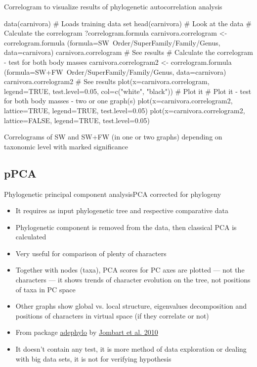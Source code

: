 \documentclass[compress, xelatex, 11pt, xcolor=svgnames, aspectratio=169,
	hyperref={
		bookmarks=true,
		unicode=true,
		colorlinks=true,
		pdftitle={Molecular data in R},
		plainpages=false,
		pdfauthor={Vojtech Zeisek},
		pdfsubject={Course about phylogeny and evolution in R},
		pdfcreator={XeLaTeX},
		pdfkeywords={R, evolution, phylogeny, molecular data},
		linkcolor=Crimson, %
		anchorcolor=Magenta, %
		citecolor=Magenta, %
		filecolor=Magenta, %
		menucolor=Magenta, %
		urlcolor=DodgerBlue, %
		},
	url={hyphens, lowtilde} %
	]{beamer}
\renewcommand{\texttt}[1]{\colorbox{Beige}{{\ttfamily #1}}}
\begin{document}
\begin{frame}[fragile]{Correlogram to visualize results of phylogenetic autocorrelation analysis}
	\begin{spluscode}
    data(carnivora) # Loads training data set
    head(carnivora) # Look at the data
    # Calculate the correlogram
    ?correlogram.formula
    carnivora.correlogram <- correlogram.formula
      (formula=SW~Order/SuperFamily/Family/Genus, data=carnivora)
    carnivora.correlogram # See results
    # Calculate the correlogram - test for both body masses
    carnivora.correlogram2 <- correlogram.formula
      (formula=SW+FW~Order/SuperFamily/Family/Genus, data=carnivora)
    carnivora.correlogram2 # See results
    plot(x=carnivora.correlogram, legend=TRUE, test.level=0.05, col=c("white",
      "black")) # Plot it
    # Plot it - test for both body masses - two or one graph(s)
    plot(x=carnivora.correlogram2, lattice=TRUE, legend=TRUE, test.level=0.05)
    plot(x=carnivora.correlogram2, lattice=FALSE, legend=TRUE, test.level=0.05)
	\end{spluscode}
\end{frame}

\begin{frame}{Correlograms of SW and SW+FW (in one or two graphs) depending on taxonomic level with marked significance}
	\texttt{[image: correlog.png]}
\end{frame}

\subsection{pPCA}

\begin{frame}{Phylogenetic principal component analysis}{PCA corrected for phylogeny}
	\begin{itemize}
		\item It requires as input phylogenetic tree and respective comparative data
		\item Phylogenetic component is removed from the data, then classical PCA is calculated
		\item Very useful for comparison of plenty of characters
		\item Together with nodes (taxa), PCA scores for PC axes are plotted --- not the characters --- it shows trends of character evolution on the tree, not positions of taxa in PC space
		\item Other graphs show global vs. local structure, eigenvalues decomposition and positions of characters in virtual space (if they correlate or not)
		\item From package \href{https://academic.oup.com/bioinformatics/article/26/15/1907/188748}{adephylo} by \href{https://www.sciencedirect.com/science/article/pii/S0022519310001736}{Jombart et al. 2010}
		\item It doesn't contain any test, it is more method of data exploration or dealing with big data sets, it is not for verifying hypothesis
	\end{itemize}
\end{frame}
\end{document}

